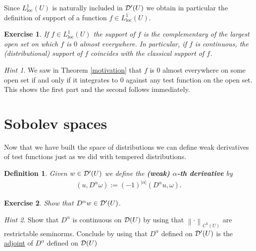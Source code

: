 \documentclass[12pt]{article}
\newtheorem{definition}{Definition}
\newtheorem{exercise}{Exercise}
\theoremstyle{remark}
\newtheorem*{hint}{Hint}
\renewcommand{\norm}[1]{\left\lVert #1 \right\rVert}\renewcommand{\abs}[1]{\left| #1 \right|}
\begin{document}
Since $L^1_{\mathrm{loc}}(U)$ is naturally included in  $\mathcal{D}'(U)$ we obtain in particular the definition of support of a function $f \in L^1_{\mathrm{loc}}(U)$.
\begin{exercise}
	If  $f \in L^1_{\mathrm{loc}}(U)$ the support of $f$ is the complementary of the largest open set on which  $f$ is  $0$ almost everywhere. In particular, if $f$ is continuous, the (distributional) support of  $f$ coincides with the classical support of  $f$. \end{exercise}
\begin{hint}
	We saw in Theorem \ref{motivation} that $f$ is  $0$ almost everywhere on some open set if and only if it integrates to $0$ against any test function on the open set. This shows the first part and the second follows immediately.
\end{hint}

\section{Sobolev spaces}
Now that we have built the space of distributions we can define weak derivatives of test functions just as we did with tempered distributions.
\begin{definition}
	Given $w \in \mathcal{D}'(U)$ we define the \textbf{(weak) $\alpha$-th derivative} by
	\begin{align*}
		(u,D^\alpha \omega):=(-1)^{\abs{\alpha} }(D^\alpha u, \omega).
	\end{align*}
\end{definition}
\begin{exercise} Show that $D^\alpha w \in\mathcal{D}'(U)$.
\end{exercise}
\begin{hint}
	Show that $D^\alpha$ is continuous on $\mathcal{D}(U)$ by using that $\norm{\cdot }_{C^k(U)}$ are restrictable seminorms. Conclude by using that $D^\alpha$ defined on $\mathcal{D}'(U)$ is the \href{https://en.wikipedia.org/wiki/Transpose_of_a_linear_map}{adjoint} of $D^\alpha$ defined on $\mathcal{D}(U)$
\end{hint}
\end{document}
